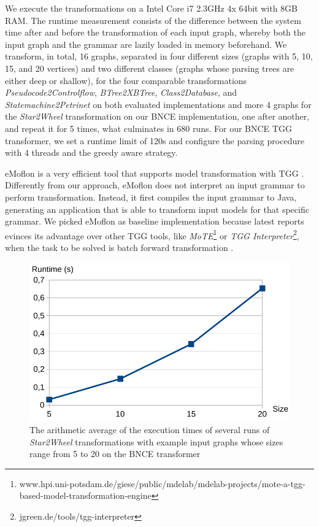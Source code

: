We execute the transformations on a Intel Core i7 2.3GHz 4x 64bit with 8GB RAM. The runtime measurement consists of the difference between the system time after and before the transformation of each input graph, whereby both the input graph and the grammar are lazily loaded in memory beforehand. We transform, in total, 16 graphs, separated in four different sizes (graphs with 5, 10, 15, and 20 vertices) and two different classes (graphs whose parsing trees are either deep or shallow), for the four comparable transformations \emph{Pseudocode2Controlflow}, \emph{BTree2XBTree}, \emph{Class2Database}, and \emph{Statemachine2Petrinet} on both evaluated implementations and more 4 graphs for the \emph{Star2Wheel} transformation on our BNCE implementation, one after another, and repeat it for 5 times, what culminates in 680 runs. For our BNCE TGG transformer, we set a runtime limit of 120s and configure the parsing procedure with 4 threads and the greedy aware strategy.

eMoflon is a very efficient tool that supports model transformation with TGG \cite{leblebici2014developing}. Differently from our approach, eMoflon does not interpret an input grammar to perform transformation. Instead, it first compiles the input grammar to Java, generating an application that is able to transform input models for that specific grammar. We picked eMoflon as baseline implementation because latest reports evinces its advantage over other TGG tools, like \emph{MoTE}\footnote{www.hpi.uni-potsdam.de/giese/public/mdelab/mdelab-projects/mote-a-tgg-based-model-transformation-engine} or \emph{TGG Interpreter}\footnote{jgreen.de/tools/tgg-interpreter}, when the task to be solved is batch forward transformation \cite{hildebrandt2013survey, leblebici2014comparison}.

\begin{figure}
	\centering
	\includegraphics[width=.45\textwidth]{figures/performance/star2wheel}
	\caption{The arithmetic average of the execution times of several runs of \emph{Star2Wheel} transformations with example input graphs whose sizes range from 5 to 20 on the BNCE transformer}
	\label{fig:performance-star2wheel}
\end{figure}

